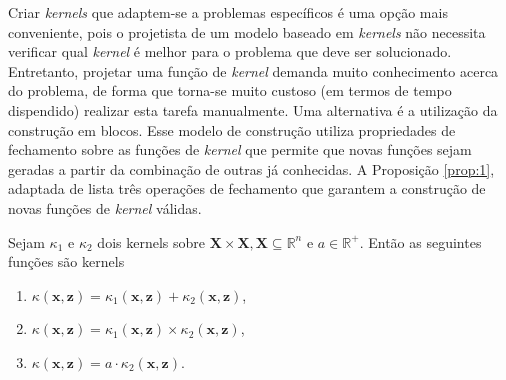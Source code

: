 
Criar \textit{kernels} que adaptem-se a problemas específicos é uma opção mais conveniente, pois o projetista de um modelo baseado em \textit{kernels} não necessita verificar qual \textit{kernel} é melhor para o problema que deve ser solucionado. Entretanto, projetar uma função de \textit{kernel} demanda muito conhecimento acerca do problema, de forma que torna-se muito custoso (em termos de tempo dispendido) realizar esta tarefa manualmente. Uma alternativa é a utilização da construção em blocos. Esse modelo de construção utiliza propriedades de fechamento sobre as funções de \textit{kernel} que permite que novas funções sejam geradas a partir da combinação de outras já conhecidas. A Proposição \ref{prop:1}, adaptada de \cite{shawe2004} lista três operações de fechamento que garantem a construção de novas funções de \textit{kernel} válidas.

\begin{proposition}
    \label{prop:1}
    Sejam $\kappa_1$ e $\kappa_2$ dois kernels sobre $\mathbf{X} \times \mathbf{X}, \mathbf{X} \subseteq
    \mathbb{R}^n$ e $a \in \mathbb{R}^+$. Então as seguintes funções são kernels

    \begin{enumerate}[label=(\roman*)]
        \item $\kappa(\mathbf{x},\mathbf{z}) = \kappa_1(\mathbf{x},\mathbf{z}) + \kappa_2(\mathbf{x},\mathbf{z})$,
        \item $\kappa(\mathbf{x},\mathbf{z}) = \kappa_1(\mathbf{x},\mathbf{z}) \times \kappa_2(\mathbf{x},\mathbf{z})$,
        \item $\kappa(\mathbf{x},\mathbf{z}) = a \cdot \kappa_2(\mathbf{x},\mathbf{z})$.
    \end{enumerate}
\end{proposition}

